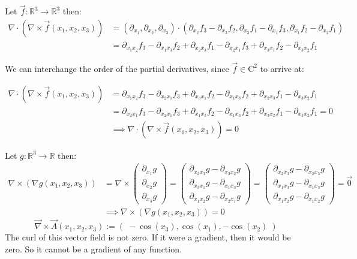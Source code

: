 \documentclass[11pt]{article}
\begin{document}
\begin{solution}
    Let $\vec{f} \colon \mathbb{R}^3 \to \mathbb{R}^3$ then:
    \begin{align*}
        \nabla \cdot (\nabla \times \vec{f}(x_1,x_2,x_3)) &= (\partial_{x_1}, \partial_{x_2}, \partial_{x_3}) \cdot (\partial _{x_2} f_3 - \partial _{x_3} f_2,\partial _{x_3} f_1 - \partial _{x_1} f_3,\partial _{x_1} f_2 - \partial _{x_2} f_1)  \\
    &=  \partial_{x_1 x_2}f_3 - \partial_{x_1 x_3}f_2 + \partial _{x_2 x_3} f_1 - \partial _{x_2 x_1} f_3 + \partial _{x_3 x_1} f_2 - \partial _{x_3 x_2} f_1
    \end{align*}

    We can interchange the order of the partial derivatives, since $\vec{f} \in \mathrm{C}^2$ to arrive at:

    \begin{align*}
    \nabla \cdot (\nabla \times \vec{f}(x_1,x_2,x_3)) &=	 \partial_{x_1 x_2}f_3 - \partial _{x_2 x_1} f_3 + \partial _{x_3 x_1} f_2 - \partial_{x_1 x_3}f_2 + \partial _{x_2 x_3} f_1  - \partial _{x_3 x_2} f_1\\
    &=	 \partial_{x_2 x_1}f_3 - \partial _{x_2 x_1} f_3 + \partial _{x_1 x_3} f_2 - \partial_{x_1 x_3}f_2 + \partial _{x_3 x_2} f_1  - \partial _{x_3 x_2} f_1 = 0\\
    &\implies  \nabla \cdot (\nabla \times \vec{f}(x_1,x_2,x_3)) =0
    \end{align*}

    Let  $g \colon \mathbb{R}^3 \to \mathbb{R}$ then: 
    \begin{align*}
        \nabla \times (\nabla g(x_1,x_2,x_3)) &= \nabla \times \begin{pmatrix}\partial_{x_1} g \\ \partial_{x_2} g \\ \partial_{x_3} g \end{pmatrix} = \begin{pmatrix} \partial_{x_2x_3} g - \partial_{x_3x_2} g \\ \partial_{x_3x_1} g - \partial_{x_1x_3} g \\ \partial_{x_1x_2} g - \partial_{x_2x_1} g \end{pmatrix} = \begin{pmatrix} \partial_{x_2x_3} g - \partial_{x_2x_3} g \\ \partial_{x_1x_3} g - \partial_{x_1x_3} g \\ \partial_{x_1x_2} g - \partial_{x_1x_2} g \end{pmatrix} = \vec{0}\\
    &\implies \nabla \times (\nabla g(x_1,x_2,x_3))  = 0
    \end{align*}
    \[
        \vec{\nabla} \times \vec{A}(x_1,x_2,x_3)
        :=
        \left(\;
            -\cos(x_3),  \cos(x_1), -\cos(x_2)
        \;\right)
    \]
    The curl of this vector field is not zero. 
    If it were a gradient, then it would be zero. 
    So it cannot be a gradient of any function.
\end{solution}
\end{document}
